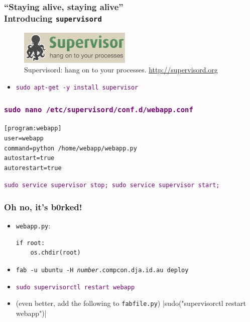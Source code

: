 \documentclass{beamer}
\newcommand\aws[1]{\textcolor{purple}{\texttt{#1}}}
\begin{document}
\begin{frame}
  \frametitle{``Staying alive, staying alive''\\Introducing
    \texttt{supervisord}}
  \begin{figure}[h!]
    \centering
    \includegraphics{imgs/supervisord_logo}
    \caption{Supervisord: hang on to your processes. \url{http://supervisord.org} }
    \label{fig:supervisord_logo}
  \end{figure}

  \begin{itemize}
  \item \aws{sudo apt-get -y install supervisor}
  \end{itemize}
  
\end{frame}

\begin{frame}[fragile]
  \frametitle{\aws{sudo nano /etc/supervisord/conf.d/webapp.conf}}
\begin{verbatim}
[program:webapp]
user=webapp
command=python /home/webapp/webapp.py
autostart=true
autorestart=true
\end{verbatim}
  \aws{sudo service supervisor stop; sudo service supervisor start;}
\end{frame}

\begin{frame}[fragile]
  \frametitle{Oh no, it's b0rked!}

  \begin{itemize}
  \item<1-> \texttt{webapp.py}: 
\begin{verbatim}
if root:
    os.chdir(root)
\end{verbatim}
  \item<2-> \texttt{fab -u ubuntu -H \textit{number}.compcon.dja.id.au
      deploy}
  \item<2-> \aws{sudo supervisorctl restart webapp}
  \item<3-> (even better, add the following to \texttt{fabfile.py})
|sudo("supervisorctl restart webapp")|
  \end{itemize}
\end{frame}
\end{document}
